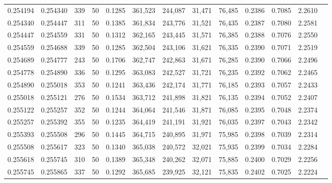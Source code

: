 \begin{tabular}{rrrrrrrrrrrrr}
0.254194 & 0.254340 &   339 &  50 &                                     0.1285 & 361,523 & 244,087 &  31,471 &  76,485 & 0.2386 & 0.7085 & 2.2610 \\
0.254340 & 0.254447 &   311 &  50 &                                     0.1385 & 361,834 & 243,776 &  31,521 &  76,435 & 0.2387 & 0.7080 & 2.2581 \\
0.254447 & 0.254559 &   331 &  50 &                                     0.1312 & 362,165 & 243,445 &  31,571 &  76,385 & 0.2388 & 0.7076 & 2.2550 \\
0.254559 & 0.254688 &   339 &  50 &                                     0.1285 & 362,504 & 243,106 &  31,621 &  76,335 & 0.2390 & 0.7071 & 2.2519 \\
0.254689 & 0.254777 &   243 &  50 &                                     0.1706 & 362,747 & 242,863 &  31,671 &  76,285 & 0.2390 & 0.7066 & 2.2496 \\
0.254778 & 0.254890 &   336 &  50 &                                     0.1295 & 363,083 & 242,527 &  31,721 &  76,235 & 0.2392 & 0.7062 & 2.2465 \\
0.254890 & 0.255018 &   353 &  50 &                                     0.1241 & 363,436 & 242,174 &  31,771 &  76,185 & 0.2393 & 0.7057 & 2.2433 \\
0.255018 & 0.255121 &   276 &  50 &                                     0.1534 & 363,712 & 241,898 &  31,821 &  76,135 & 0.2394 & 0.7052 & 2.2407 \\
0.255122 & 0.255257 &   352 &  50 &                                     0.1244 & 364,064 & 241,546 &  31,871 &  76,085 & 0.2395 & 0.7048 & 2.2374 \\
0.255257 & 0.255392 &   355 &  50 &                                     0.1235 & 364,419 & 241,191 &  31,921 &  76,035 & 0.2397 & 0.7043 & 2.2342 \\
0.255393 & 0.255508 &   296 &  50 &                                     0.1445 & 364,715 & 240,895 &  31,971 &  75,985 & 0.2398 & 0.7039 & 2.2314 \\
0.255508 & 0.255617 &   323 &  50 &                                     0.1340 & 365,038 & 240,572 &  32,021 &  75,935 & 0.2399 & 0.7034 & 2.2284 \\
0.255618 & 0.255745 &   310 &  50 &                                     0.1389 & 365,348 & 240,262 &  32,071 &  75,885 & 0.2400 & 0.7029 & 2.2256 \\
0.255745 & 0.255865 &   337 &  50 &                                     0.1292 & 365,685 & 239,925 &  32,121 &  75,835 & 0.2402 & 0.7025 & 2.2224 \\

\end{tabular}
